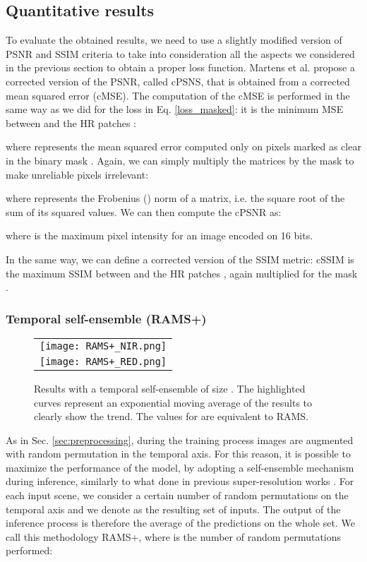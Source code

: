 \documentclass[journal]{IEEEtran}
\begin{document}
\subsection{Quantitative results}
To evaluate the obtained results, we need to use a slightly modified version of PSNR and SSIM \cite{wang2004image} criteria to take into consideration all the aspects we considered in the previous section to obtain a proper loss function. Martens et al. \cite{martens2019super} propose a corrected version of the PSNR, called cPSNS, that is obtained from a corrected mean squared error (cMSE). The computation of the cMSE is performed in the same way as we did for the loss in Eq. \ref{loss_masked}: it is the minimum MSE between  and the HR patches :



\noindent where  represents the mean squared error computed only on pixels marked as clear in the binary mask . Again, we can simply multiply the matrices by the mask to make unreliable pixels irrelevant:



 \noindent where  represents the Frobenius () norm of a matrix, i.e. the square root of the sum of its squared values. We can then compute the cPSNR as:


where  is the maximum pixel intensity for an image encoded on 16 bits.

In the same way, we can define a corrected version of the SSIM metric: cSSIM is the maximum SSIM between  and the HR patches , again multiplied for the mask .




\subsubsection{Temporal self-ensemble (RAMS+)}
\begin{figure}[h]
\centering
\begin{tabular}{c}
\texttt{[image: RAMS+\_NIR.png]}\\
\texttt{[image: RAMS+\_RED.png]}
\end{tabular}
\caption{Results with a temporal self-ensemble of size . The highlighted curves represent an exponential moving average of the results to clearly show the trend. The values for  are equivalent to RAMS.}
\label{fig:RAMS+}
\end{figure}
As in Sec. \ref{sec:preprocessing}, during the training process images are augmented with random permutation in the temporal axis. For this reason, it is possible to maximize the performance of the model, by adopting a self-ensemble mechanism during inference, similarly to what done in previous super-resolution works \cite{lim2017enhanced,timofte2016seven,zhang2018image}. For each input scene, we consider a certain number  of random permutations on the temporal axis and we denote as  the resulting set of inputs. The output of the inference process is therefore the average of the predictions on the whole set. We call this methodology RAMS+, where  is the number of random permutations performed:
\end{document}
